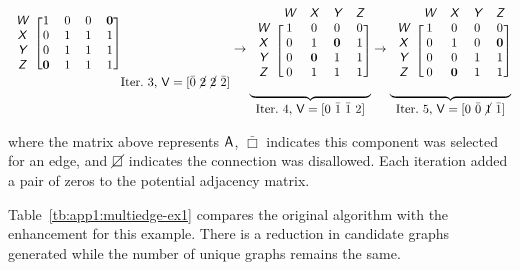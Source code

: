 \begin{align*}
\begin{aligned}
{\begin{blockarray}{ccccc}
\begin{block}{c[cccc]}
\xcolor{W} & 1 & 0 & 0 & \bm{0} \\
\xcolor{X} & 0 & 1 & 1 & 1 \\
\xcolor{Y} & 0 & 1 & 1 & 1 \\
\xcolor{Z} & \bm{0} & 1 & 1 & 1 \\
\end{block}
\end{blockarray}
}_{\textstyle \text{Iter.~3, }\xvar{V} = [\bar{0}\ \rhilght{2}\ \rhilght{2}\ \bar{\ghilght{2}}] }
\rightarrow
\underbrace{
\begin{blockarray}{ccccc}
& \xcolor{W} & \xcolor{X} & \xcolor{Y} & \xcolor{Z} \\
\begin{block}{c[cccc]}
\xcolor{W} & 1 & 0 & 0 & 0 \\
\xcolor{X} & 0 & 1 & \bm{0} & 1 \\
\xcolor{Y} & 0 & \bm{0} & 1 & 1 \\
\xcolor{Z} & 0 & 1 & 1 & 1 \\
\end{block}
\end{blockarray}
}_{\textstyle \text{Iter.~4, }\xvar{V} = [0\ \bar{1}\ \bar{\ghilght{1}}\ \ghilght{2}] }
\rightarrow
\underbrace{
\begin{blockarray}{ccccc}
& \xcolor{W} & \xcolor{X} & \xcolor{Y} & \xcolor{Z} \\
\begin{block}{c[cccc]}
\xcolor{W} & 1 & 0 & 0 & 0 \\
\xcolor{X} & 0 & 1 & 0 & \bm{0} \\
\xcolor{Y} & 0 & 0 & 1 & 1 \\
\xcolor{Z} & 0 & \bm{0} & 1 & 1 \\
\end{block}
\end{blockarray}
}_{\textstyle \text{Iter.~5, }\xvar{V} = [0\ \bar{0}\ \rhilght{1}\ \bar{\ghilght{1}}] }
\end{aligned}
\end{align*}

\noindent where the matrix above represents $\textup{\textsf{A}}$, $\bar{\Box}$ indicates this component was selected for an edge, and $\cancel{\Box}$ indicates the connection was disallowed. Each iteration added a pair of zeros to the potential adjacency matrix.

Table~\ref{tb:app1:multiedge-ex1} compares the original algorithm with the enhancement for this example.
There is a reduction in candidate graphs generated while the number of unique graphs remains the same.

